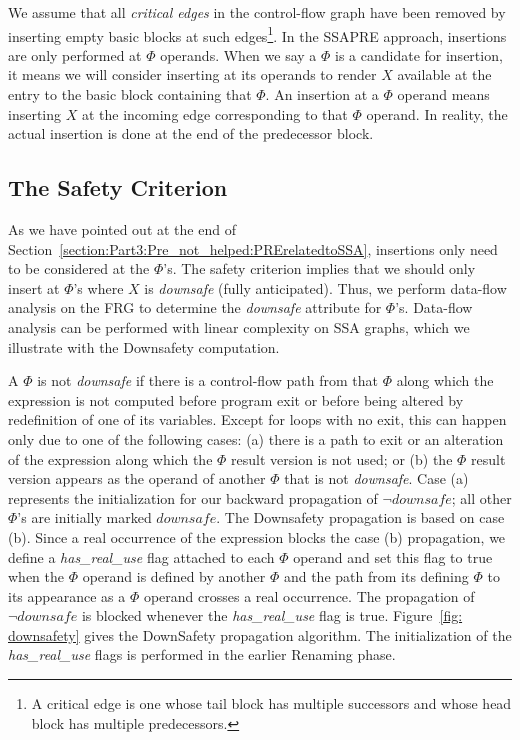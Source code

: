 We assume that all \emph{critical edges}
in the control-flow graph have been removed by inserting empty basic blocks
at such edges\footnote{A critical edge is one whose tail block has multiple
successors and whose head block has multiple predecessors.}.
In the SSAPRE approach, insertions are only performed at $\Phi$ operands.
When we say a $\Phi$ is a candidate for insertion, it means we will consider
inserting at its operands to render $X$ available at the entry to the basic
block containing that $\Phi$.  An insertion at a $\Phi$ operand means inserting
$X$ at the incoming edge corresponding to that $\Phi$ operand.  In reality,
the actual insertion is done at the end of the predecessor block.

\subsection{The Safety Criterion}

As we have pointed out at the end of 
Section~\ref{section:Part3:Pre_not_helped:PRErelatedtoSSA},
insertions only need to be considered at the $\Phi$'s.
The safety criterion implies that we should only insert at $\Phi$'s where $X$ 
is \emph{downsafe} (fully anticipated).  Thus, we perform data-flow analysis on
the FRG to determine the \emph{downsafe} attribute for $\Phi$'s.
Data-flow analysis can be performed with linear complexity on SSA graphs, which
we illustrate with the Downsafety computation.

A $\Phi$ is not \emph{downsafe} if there is a control-flow path from that 
$\Phi$ along which the expression is not computed before program exit or 
before 
being altered by redefinition of one of its variables.  Except for loops with
no exit, this can happen only due to one of the following cases: (a) there
is a path to exit or an alteration of the expression
along which the $\Phi$ result version is not used; or (b) the $\Phi$ result
version appears as the operand of another $\Phi$ that is not \emph{downsafe}.
Case (a) represents the initialization for our backward propagation of 
$\neg downsafe$; all other $\Phi$'s are initially marked $downsafe$.
The Downsafety propagation is based on case (b).  Since a real occurrence of 
the expression blocks the case (b) propagation, we define a 
\emph{has\_real\_use} flag attached to each $\Phi$ operand and set this flag to
true when the $\Phi$ operand is defined by another $\Phi$ and the path from its
defining $\Phi$ to its appearance as a $\Phi$ operand crosses a real occurrence.
The propagation of $\neg downsafe$ is blocked whenever the \emph{has\_real\_use}
flag is true.  Figure~\ref{fig: downsafety} gives the DownSafety propagation
algorithm.  The initialization of the \emph{has\_real\_use}
flags is performed in the earlier Renaming phase.

